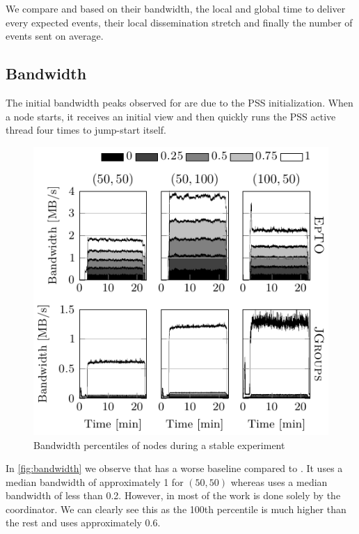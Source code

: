\par
We compare \epto and \jgroups based on their bandwidth, the local and global time to deliver every expected events, their local dissemination stretch and finally the number of events sent on average.
\subsection{Bandwidth}
The initial bandwidth peaks observed for \epto are due to the PSS initialization. When a node starts, it receives an initial view and then quickly runs the PSS active thread four times to jump-start itself.
 \begin{figure}[hpt]
 	\centering
 	\includegraphics[width=\linewidth]{figures/bandwidth-nochurn.pdf}
 	\vspace{-2mm} 
 	\caption{Bandwidth percentiles of nodes during a stable experiment}
 	\vspace{-2mm} 
 	\label{fig:bandwidth}
 \end{figure}
In \autoref{fig:bandwidth} we observe that \epto has a worse baseline compared to \jgroups. It uses a median bandwidth of approximately \SI{1}{\mbps} for $(50,50)$ whereas \jgroups uses a median bandwidth of less than \SI{0.2}{\mbps}. However, in \jgroups most of the work is done solely by the coordinator. We can clearly see this as the 100th percentile is much higher than the rest and uses approximately \SI{.6}{\mbps}.

